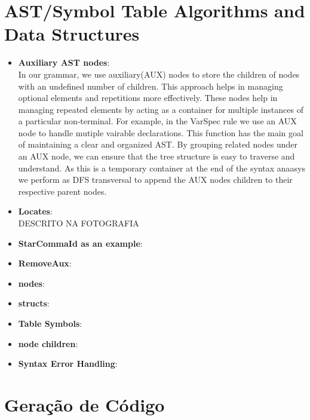 \documentclass[12pt]{article}
\begin{document}
\section{AST/Symbol Table Algorithms and Data Structures}
\begin{itemize}
    \item \textbf{Auxiliary AST nodes}: \\In our grammar, we use auxiliary(AUX) nodes to store the children of nodes with an undefined number of children. This approach helps in managing optional elements and repetitions more effectively. These nodes help in managing repeated elements by acting as a container for multiple instances of a particular non-terminal. For example, in the VarSpec rule we use an AUX node to handle mutiple vairable declarations. This function has the main goal of maintaining a clear and organized AST. By grouping related nodes under an AUX node, we can ensure that the tree structure is easy to traverse and understand. As this is a temporary container at the end of the syntax anaasys we perform as DFS transversal to append the AUX nodes children to their respective parent nodes.
    \item \textbf{Locates}: \\ DESCRITO NA FOTOGRAFIA 
    \item \textbf{StarCommaId as an example}: \\
    \item \textbf{RemoveAux}: \\ 
    \item \textbf{nodes}: \\ 
    \item \textbf{structs}: \\ 
    \item \textbf{Table Symbols}: \\
    \item \textbf{node children}: \\
    \item \textbf{Syntax Error Handling}:

\end{itemize}

\begin{center}
\end{center}


\section{Geração de Código}
\end{document}
